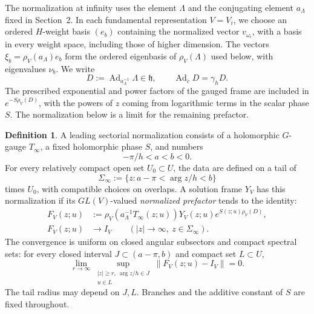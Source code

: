 \documentclass[11pt,leqno]{amsart}
\numberwithin{equation}{section}
\theoremstyle{plain}
\theoremstyle{definition}
\newtheorem{definition}[theorem]{Definition}
\theoremstyle{plain}
\theoremstyle{definition}
\theoremstyle{remark}
\newcommand{\gh}{\mathfrak h}
\begin{document}
The normalization at infinity uses the element $\Lambda$ and the conjugating element $a_\Lambda$ fixed in Section~2.  In each fundamental representation $V=V_i$, we choose an ordered $H$-weight basis $(e_b)$ containing the normalized vector $v_{\omega_i}$, with a basis in every weight space, including those of higher dimension.  The vectors $\xi_b=\rho_V(a_\Lambda)e_b$ form the ordered eigenbasis of $\rho_V(\Lambda)$ used below, with eigenvalues $\nu_b$.  We write
\[
 D:=\operatorname{Ad}_{a_\Lambda^{-1}}\Lambda\in\gh,
 \qquad \operatorname{Ad}_{\dot c}D=\gamma_hD.
\]
  The prescribed exponential and power factors of the gauged frame are included in $e^{-S\rho_V(D)}$, with the powers of $z$ coming from logarithmic terms in the scalar phase $S$.  The normalization below is a limit for the remaining prefactor.

\begin{definition}\label{def:leading-sectorial-normalization}
A leading sectorial normalization consists of a holomorphic $G$-gauge $T_\infty$, a fixed holomorphic phase $S$, and numbers
\[
 -\pi/h<a<b<0.
\]
For every relatively compact open set $U_0\subset U$, the data are defined on a tail of
\[
 \Sigma_\infty:=\{z:a-\pi<\arg z/h<b\}
\]
times $U_0$, with compatible choices on overlaps.  A solution frame $Y_V$ has this normalization if its $GL(V)$-valued \emph{normalized prefactor} tends to the identity:
\begin{equation}\label{eq:general-sectorial-columns}
 \begin{aligned}
 F_V(z;u)&:=\rho_V(a_\Lambda^{-1}T_\infty(z;u))Y_V(z;u)
                e^{S(z;u)\rho_V(D)},\\
 F_V(z;u)&\longrightarrow I_V
 \qquad(|z|\to\infty,\ z\in\Sigma_\infty).
 \end{aligned}
\end{equation}
The convergence is uniform on closed angular subsectors and compact spectral sets: for every closed interval $J\subset(a-\pi,b)$ and compact set $L\subset U$,
\[
 \lim_{r\to\infty}
 \sup_{\substack{|z|\ge r,\ \arg z/h\in J\\u\in L}}
 \left\|F_V(z;u)-I_V\right\|=0.
\]
The tail radius may depend on $J,L$.  Branches and the additive constant of $S$ are fixed throughout.
\end{definition}
\end{document}
